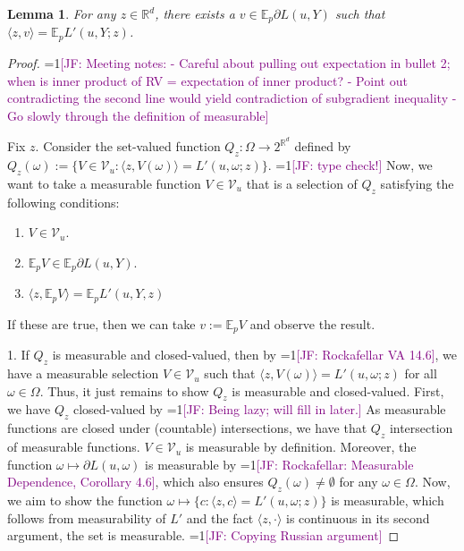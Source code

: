 \documentclass{article}
\newcommand{\Comments}{1}
\newcommand{\mynote}[2]{\ifnum\Comments=1\textcolor{#1}{#2}\fi}
\newcommand{\jessie}[1]{\mynote{purple}{[JF: #1]}}
\newcommand{\reals}{\mathbb{R}}
\newcommand{\B}{\mathcal{B}}
\newcommand{\E}{\mathbb{E}}
\newcommand{\V}{\mathcal{V}}
\newcommand{\inprod}[2]{\langle #1, #2 \rangle}%
\newtheorem{lemma}{Lemma}
\begin{document}
\begin{lemma}
	For any $z \in \reals^d$, there exists a $v \in \E_p \partial L(u,Y)$ such that $\inprod{z}{v} = \E_p L'(u,Y;z)$.
\end{lemma}
\begin{proof}
	\jessie{Meeting notes: - Careful about pulling out expectation in bullet 2; when is inner product of RV = expectation of inner product? - Point out contradicting the second line would yield contradiction of subgradient inequality - Go slowly through the definition of measurable}

Fix $z$.
Consider the set-valued function $Q_z : \Omega \to 2^{\reals^d}$ defined by $Q_z(\omega) := \{V \in \V_u: \inprod{z}{V(\omega)} = L'(u,\omega;z) \}$. \jessie{type check!}
Now, we want to take a measurable function $V \in \V_u$ that is a selection of $Q_z$ satisfying the following conditions:
\begin{enumerate}
	\item $V \in \V_u$.
	\item $\E_p V \in \E_p \partial L(u,Y)$.
	\item $\inprod{z}{\E_p V} = \E_p L'(u,Y,z)$
\end{enumerate} 
If these are true, then we can take $v := \E_p V$ and observe the result.

\bigskip

	
1.  
If $Q_z$ is measurable and closed-valued, then by \jessie{Rockafellar VA 14.6}, we have a measurable selection $V \in \V_u$ such that $\inprod{z}{V(\omega)} = L'(u,\omega; z)$ for all $\omega \in \Omega$.
Thus, it just remains to show $Q_z$ is measurable and closed-valued.
First, we have $Q_z$ closed-valued by \jessie{Being lazy; will fill in later.}
As measurable functions are closed under (countable) intersections, we have that $Q_z$ intersection of measurable functions.
$V \in \V_u$ is measurable by definition.
Moreover, the function $\omega \mapsto \partial L(u,\omega)$ is measurable by \jessie{Rockafellar: Measurable Dependence, Corollary 4.6}, which also ensures $Q_z(\omega) \neq \emptyset$ for any $\omega \in \Omega$.
Now, we aim to show the function $\omega \mapsto \{c : \inprod{z}{c} = L'(u,\omega;z)\}$ is measurable, which follows from measurability of $L'$ and the fact $\inprod{z}{\cdot}$ is continuous in its second argument, the set is measurable. \jessie{Copying Russian argument}


\end{proof}
\end{document}
